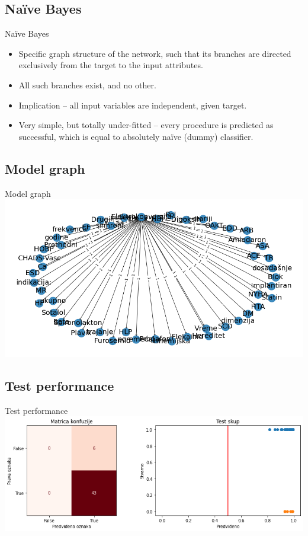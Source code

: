 \documentclass[hyperref={bookmarks=false}]{beamer}
\begin{document}
\subsection{Naïve Bayes}
\begin{frame}{Naïve Bayes}
\begin{itemize}
    \item Specific graph structure of the network, such that its branches are directed exclusively from the target to the input attributes.
    \item All such branches exist, and no other.
    \item Implication -- all input variables are independent, given target.
    \item Very simple, but totally under-fitted -- every procedure is predicted as successful, which is equal to absolutely naïve (dummy) classifier.
\end{itemize}
\end{frame}

\subsection{Model graph}
\begin{frame}{Model graph}
\includegraphics[width=\textwidth]{naive1.png}
\end{frame}

\subsection{Test performance}
\begin{frame}{Test performance}
\includegraphics[width=\textwidth]{naive2.png}
\end{frame}
\end{document}
